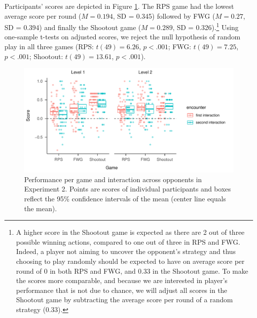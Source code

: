 \documentclass[smallextended]{svjour3}       %
\begin{document}
Participants' scores are depicted in Figure \ref{fig:exp2-score-by-opp}.
The RPS game had the lowest average score per round (\(M = 0.194\), SD =
0.345) followed by FWG (\(M = 0.27\), SD = 0.394) and finally the
Shootout game (\(M = 0.289\), SD = 0.326).\footnote{A higher score in
  the Shootout game is expected as there are 2 out of three possible
  winning actions, compared to one out of three in RPS and FWG. Indeed,
  a player not aiming to uncover the opponent's strategy and thus
  choosing to play randomly should be expected to have on average score
  per round of 0 in both RPS and FWG, and 0.33 in the Shootout game. To
  make the scores more comparable, and because we are interested in
  player's performance that is not due to chance, we will adjust all
  scores in the Shootout game by subtracting the average score per round
  of a random strategy (0.33).} Using one-sample t-tests on adjusted
scores, we reject the null hypothesis of random play in all three games
(RPS: \(t(49) = 6.26\), \(p < .001\); FWG: \(t(49) = 7.25\),
\(p < .001\); Shootout: \(t(49) = 13.61\), \(p < .001\)).

\begin{figure}

{\centering \includegraphics[width=\textwidth]{CBB_v2_files/figure-latex/exp2-score-by-opp-1} 

}

\caption{\label{fig:exp2-score-by-opp}Performance per game and interaction across opponents in Experiment 2. Points are scores of individual participants and boxes reflect the 95\% confidence intervals of the mean (center line equals the mean).}\label{fig:exp2-score-by-opp}
\end{figure}
\end{document}

